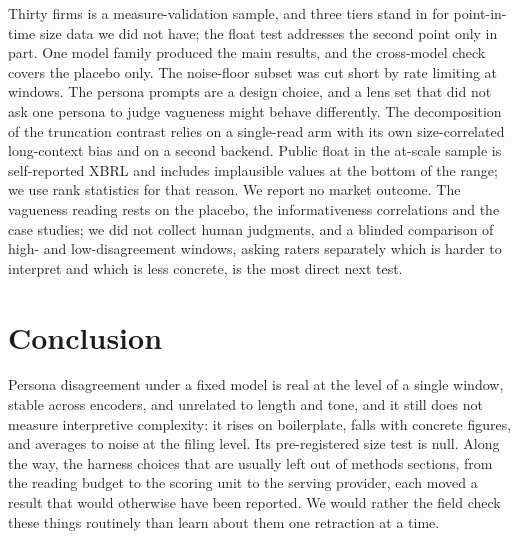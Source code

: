 \documentclass[sigconf,nonacm]{acmart}
\begin{document}
Thirty firms is a measure-validation sample, and three tiers stand in for point-in-time
size data we did not have; the float test addresses the second point only in part. One
model family produced the main results, and the cross-model check covers the placebo
only. The noise-floor subset was cut short by rate limiting at \NoiseN{} windows. The
persona prompts are a design choice, and a lens set that did not ask one persona to
judge vagueness might behave differently. The decomposition of the truncation contrast
relies on a single-read arm with its own size-correlated long-context bias and on a
second backend. Public float in the at-scale sample is self-reported XBRL and includes
implausible values at the bottom of the range; we use rank statistics for that reason.
We report no market outcome. The vagueness reading rests on the placebo, the
informativeness correlations and the case studies; we did not collect human judgments,
and a blinded comparison of high- and low-disagreement windows, asking raters separately
which is harder to interpret and which is less concrete, is the most direct next test.

\section{Conclusion}

Persona disagreement under a fixed model is real at the level of a single window,
stable across encoders, and unrelated to length and tone, and it still does not
measure interpretive complexity: it rises on boilerplate, falls with concrete figures,
and averages to noise at the filing level. Its pre-registered size test is null. Along
the way, the harness choices that are usually left out of methods sections, from the
reading budget to the scoring unit to the serving provider, each moved a result that
would otherwise have been reported. We would rather the field check these things
routinely than learn about them one retraction at a time.





\appendix
\end{document}
